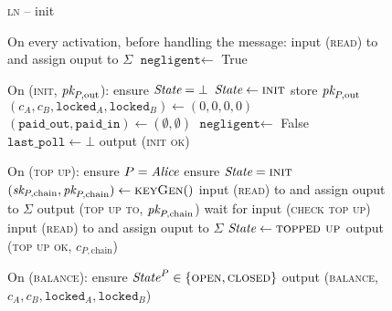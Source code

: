 \begin{figure}[H]
  \begin{processbox}{\textsc{ln} -- init}
    \begin{algorithmic}[1]
      \State {}
      \State {}
      \State On every activation, before handling the message:
      \Indent
         
          \State input (\textsc{read}) to \ledger and assign ouput to $\Sigma$
           
            \State $\texttt{negligent} \gets$ True
            \label{code:ln:init:negligent}
          \EndIf
        \EndIf
      \EndIndent
      \Statex

      \State On (\textsc{init}, $\textit{pk}_{P, \mathrm{out}}$):
      \Indent
        \State ensure $\itistate = \bot$
        \State $\itistate \gets \textsc{init}$
        \State store $\textit{pk}_{P, \mathrm{out}}$
        \State $(c_A, c_B, \texttt{locked}_A, \texttt{locked}_B) \gets (0, 0, 0,
        0)$
        \State $(\texttt{paid\_out}, \texttt{paid\_in}) \gets (\emptyset,
        \emptyset)$
        \State $\texttt{negligent} \gets$ False
        \State $\texttt{last\_poll} \gets \bot$
        \State output (\textsc{init ok})
      \EndIndent
      \Statex

      \State On (\textsc{top up}):
      \Indent
        \State ensure $P = \mathit{Alice}$ 
        \State ensure $\itistate = \textsc{init}$
        \label{code:ln:init:change-state}
        \State $(\textit{sk}_{P, \mathrm{chain}}, \textit{pk}_{P, \mathrm{chain}}) \gets
        \textsc{keyGen}()$
        \State input (\textsc{read}) to \ledger and assign ouput to $\Sigma$
        \State output (\textsc{top up to}, $\textit{pk}_{P, \mathrm{chain}}$)
          \State {}
          \State wait for input (\textsc{check top up})
          \State input (\textsc{read}) to \ledger and assign ouput to $\Sigma$
        \EndWhile
        \State $\itistate \gets \textsc{topped up}$
        \State output (\textsc{top up ok}, $c_{P, \mathrm{chain}}$)
      \EndIndent
      \Statex

      \State On (\textsc{balance}):
      \Indent
        \State ensure $\mathit{State}^P \in \{\textsc{open}, \textsc{closed}\}$
        \label{code:functionality:chan:skeleton:base:balance:start}
        \State output (\textsc{balance}, $c_A, c_B, \texttt{locked}_A,
        \texttt{locked}_B$)
        \label{code:functionality:chan:skeleton:base:balance:end}
      \EndIndent
    \end{algorithmic}
  \end{processbox}
  \caption{}
  \label{code:ln:init}
\end{figure}

